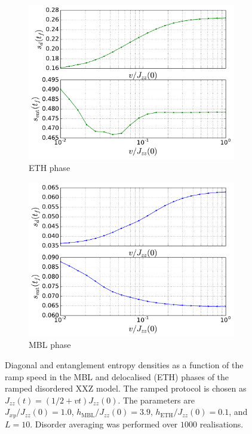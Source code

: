 \documentclass{SciPost}
\newcommand\0{\scalebox{-1}[1]{0}}
\begin{document}
\begin{figure}[t!]
	\centering
	\begin{subfigure}[b]{0.496\textwidth}
		\includegraphics[width=\textwidth]{example1_ETH}
		\caption{ETH phase}
		\label{fig:gull}
	\end{subfigure}
	\begin{subfigure}[b]{0.496\textwidth}
		\includegraphics[width=\textwidth]{example1_MBL}
		\caption{MBL phase}
		\label{fig:tiger}
	\end{subfigure}
	\caption{\label{fig:example1} Diagonal and entanglement entropy densities as a function of the ramp speed in the MBL and delocalised (ETH) phases of the ramped disordered XXZ model. The ramped protocol is chosen as $J_{zz}(t) = (1/2 + vt)J_{zz}(0)$. The parameters are $J_{xy}/J_{zz}(0)=1.0$, $h_\mathrm{MBL}/J_{zz}(0)=3.9$, $h_\mathrm{ETH}/J_{zz}(0)=0.1$, and $L=10$. Disorder averaging was performed over $1000$ realisations.}  
\end{figure}
\end{document}
